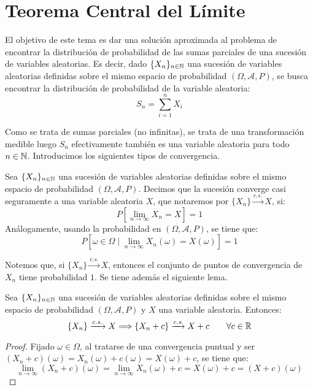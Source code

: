 \chapter{Teorema Central del Límite}

El objetivo de este tema es dar una solución aproximada al problema de encontrar la distribución de probabilidad de las sumas parciales de una sucesión de variables aleatorias. Es decir, dado $\{X_n\}_{n\in \mathbb{N}}$ una sucesión de variables aleatorias definidas sobre el mismo espacio de probabilidad $(\Omega, \mathcal{A}, P)$, se busca encontrar la distribución de probabilidad de la variable aleatoria:
\begin{equation*}
    S_n = \sum_{i=1}^{n} X_i
\end{equation*}

Como se trata de sumas parciales (no infinitas), se trata de una transformación medible luego $S_n$ efectivamente también es una variable aleatoria para todo $n\in \mathbb{N}$. Introducimos los siguientes tipos de convergencia.
\begin{definicion}
    Sea $\{X_n\}_{n\in \mathbb{N}}$ una sucesión de variables aleatorias definidas sobre el mismo espacio de probabilidad $(\Omega, \mathcal{A}, P)$. Decimos que la sucesión converge casi seguramente a una variable aleatoria $X$, que notaremos por $\{X_n\} \xrightarrow{c.s.} X$, si:
    \begin{equation*}
        P\left[\lim_{n\to \infty} X_n = X\right] = 1
    \end{equation*}
    Análogamente, usando la probabilidad en $(\Omega, \mathcal{A}, P)$, se tiene que:
    \begin{equation*}
        P\left[\omega\in \Omega\mid \lim_{n\to \infty} X_n(\omega) = X(\omega)\right] = 1
    \end{equation*}
\end{definicion}
Notemos que, si $\{X_n\} \xrightarrow{c.s.} X$, entonces el conjunto de puntos de convergencia de $X_n$ tiene probabilidad $1$. Se tiene además el siguiente lema.
\begin{lema}\label{lema:suma_convergencia_cs}
    Sea $\{X_n\}_{n\in \mathbb{N}}$ una sucesión de variables aleatorias definidas sobre el mismo espacio de probabilidad $(\Omega, \mathcal{A}, P)$ y $X$ una variable aleatoria. Entonces:
    \begin{equation*}
        \{X_n\} \xrightarrow{c.s.} X \Longrightarrow \{X_n+ c\} \xrightarrow{c.s} X + c \qquad \forall c\in \mathbb{R}
    \end{equation*}
\end{lema}
\begin{proof}
    Fijado $\omega \in \Omega$, al tratarse de una convergencia puntual y ser $(X_n+ c)(\omega) = X_n(\omega) + c(\omega)= X(\omega) + c$, se tiene que:
    \begin{equation*}
        \lim_{n\to \infty} (X_n+ c)(\omega) = \lim_{n\to \infty} X_n(\omega) + c = X(\omega) + c = (X+c)(\omega)
    \end{equation*}
\end{proof}


